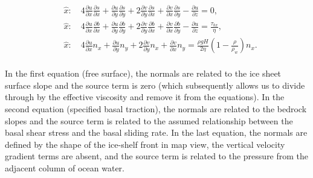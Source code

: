 \begin{align*}
  & \hat{x}:\quad 4\frac{\partial u}{\partial x}\frac{\partial s}{\partial x}+ \frac{\partial u}{\partial y}\frac{\partial s}{\partial y}+2 \frac{\partial v}{\partial y}\frac{\partial s}{\partial x}+\frac{\partial v}{\partial x}\frac{\partial s}{\partial y}-\frac{\partial u}{\partial z}=0, \\ 
  & \hat{x}:\quad 4\frac{\partial u}{\partial x}\frac{\partial b}{\partial x}+\frac{\partial u}{\partial y}\frac{\partial b}{\partial y}+2\frac{\partial v}{\partial y}\frac{\partial b}{\partial x}+\frac{\partial v}{\partial x}\frac{\partial b}{\partial y}-\frac{\partial u}{\partial z}=\frac{\tau _{bx}}{\eta }, \\ 
  & \hat{x}:\quad 4\frac{\partial u}{\partial x}n_{x}+\frac{\partial u}{\partial y}n_{y}+2\frac{\partial v}{\partial y}n_{x}+\frac{\partial v}{\partial x}n_{y}=\frac{\rho gH}{2\eta }\left( 1-\frac{\rho }{\rho _{w}} \right)n_{x}. \\
\end{align*}

In the first equation (free surface), the normals are related to the ice sheet surface slope and the source term is zero (which subsequently allows us to divide through by the effective viscosity and remove it from the equations). In the second equation (specified basal traction), the normals are related to the bedrock slopes and the source term is related to the assumed relationship between the basal shear stress and the basal sliding rate. In the last equation, the normals are defined by the shape of the ice-shelf front in map view, the vertical velocity gradient terms are absent, and the source term is related to the pressure from the adjacent column of ocean water.
